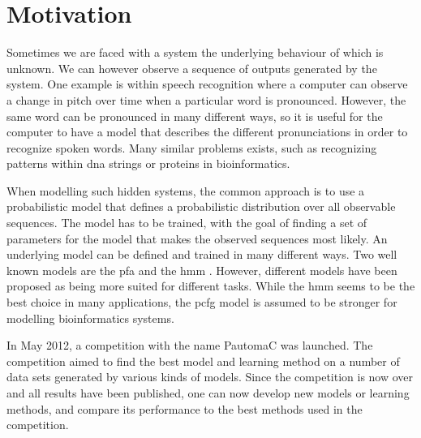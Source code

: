 \section{Motivation}
Sometimes we are faced with a system the underlying behaviour of which is unknown. We can however observe a sequence of outputs generated by the system. One example is within speech recognition \cite{Rabiner89hmm} where a computer can observe a change in pitch over time when a particular word is pronounced. However, the same word can be pronounced in many different ways, so it is useful for the computer to have a model that describes the different pronunciations in order to recognize spoken words. Many similar problems exists, such as recognizing patterns within \gls{dna} strings or proteins in bioinformatics\cite{Sakakibara2005}.

When modelling such hidden systems, the common approach is to use a probabilistic model that defines a probabilistic distribution over all observable sequences. The model has to be trained, with the goal of finding a set of parameters for the model that makes the observed sequences most likely. An underlying model can be defined and trained in many different ways. Two well known models are the \gls{pfa} \cite{pazintroduction} and the \gls{hmm} \cite{Rabiner89hmm}. However, different models have been proposed as being more suited for different tasks. While the \gls{hmm} seems to be the best choice in many applications, the \gls{pcfg} model is assumed to be stronger for modelling bioinformatics systems\cite{Sakakibara2005}.

In May 2012, a competition with the name PautomaC was launched. The competition aimed to find the best model and learning method on a number of data sets generated by various kinds of models. Since the competition is now over and all results have been published, one can now develop new models or learning methods, and compare its performance to the best methods used in the competition.